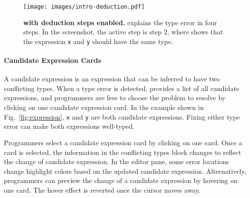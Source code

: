 \begin{figure}[ht]
    \centering
    \texttt{[image: images/intro-deduction.pdf]}
    \caption[\chameleon{} with deduction steps enabled]{
        \textbf{\chameleon{} with deduction steps enabled.}
        \chameleon{} explains the type error in four steps. In the screenshot, the active step is step 2, where \chameleon{} shows that the expression \texttt{x} and \texttt{y} should have the same type. 
    }
    \label{fig:deduction}
\end{figure}



\paragraph{Candidate Expression Cards}  \label{sub:candidate-expression}


A candidate expression is an expression that can be inferred to have two conflicting types. 
When a type error is detected, \chameleon{} provides a list of all candidate expressions, and programmers are free to choose the problem to resolve by clicking on one candidate expression card. In the example shown in Fig.~\ref{fig:expression}, \texttt{x} and \texttt{y} are both candidate expressions. Fixing either type error can make both expressions well-typed.




Programmers select a candidate expression card by clicking on one card. Once a card is selected, the information in the conflicting types block changes to reflect the change of candidate expression. In the editor pane, some error locations change highlight colors based on the updated candidate expression. Alternatively, programmers can preview the change of a candidate expression by hovering on one card. The hover effect is reverted once the cursor moves away. 


